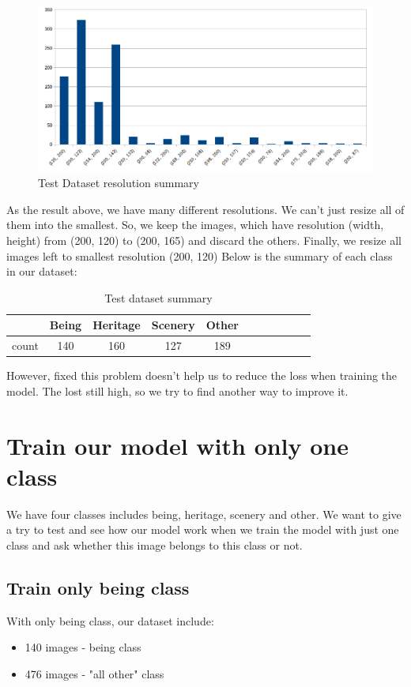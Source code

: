 \documentclass[11pt]{article}
\begin{document}
\begin{figure}[H]
\centering
\includegraphics[width=1\textwidth]{images/resolution_summary}
\caption{Test Dataset resolution summary}
\end{figure}

As the result above, we have many different resolutions. We can't just resize all of them into the smallest. So, we keep the images, which have resolution (width, height) from (200, 120) to (200, 165) and discard the others.
Finally, we resize all images left to smallest resolution (200, 120)
Below is the summary of each class in our dataset:
\begin{table}[H]
\begin{center}
\begin{tabular}{| c | c | c | c | c | c | c | c | c | c | c |}
\hline
 & Being & Heritage & Scenery & Other\\
\hline
count & 140 & 160 & 127 & 189\\

\hline
\end{tabular}
\caption {Test dataset summary}
\end{center}
\end{table}

However, fixed this problem doesn't help us to reduce the loss when training the model. The lost still high, so we try to find another way to improve it.

\section{Train our model with only one class}
We have four classes includes being, heritage, scenery and other. We want to give a try to test and see how our model work when we train the model with just one class and ask whether this image belongs to this class or not.

\subsection{Train only being class}
With only being class, our dataset include: 
\begin{itemize}
\item 140 images - being class
\item 476 images - "all other" class
\end{itemize}
\end{document}

